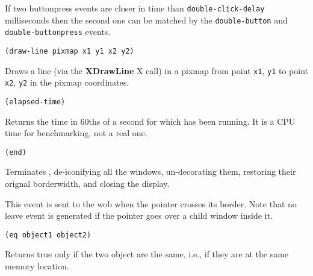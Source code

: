 If two buttonpress events are closer in time than \verb"double-click-delay"
milliseconds then the second one can be matched by the \verb"double-button"
and \verb"double-buttonpress" events.

        
{\usagefont\begin{verbatim}
(draw-line pixmap x1 y1 x2 y2)
\end{verbatim}}\usageupspace

Draws a line (via the {\bf XDrawLine} X call) in a pixmap from point
\verb"x1", \verb"y1" to point \verb"x2", \verb"y2" in the pixmap
coordinates. 



{\usagefont\begin{verbatim}
(elapsed-time)
\end{verbatim}}\usageupspace

Returns the time in 60ths of a second for which {\GWM} has been running. It
is a CPU time for benchmarking, not a real one.

        
{\usagefont\begin{verbatim}
(end)
\end{verbatim}}\usageupspace

Terminates {\GWM}, de-iconifying all the windows, un-decorating them,
restoring their orignal borderwidth, and closing the display.

        

This event is sent to the wob when the pointer crosses its border.
Note that no leave event is generated if the pointer goes over a child window
inside it.


{\usagefont\begin{verbatim}
(eq object1 object2)
\end{verbatim}}\usageupspace

Returns true only if the two object are the same, i.e., if they are at the
same memory location.


